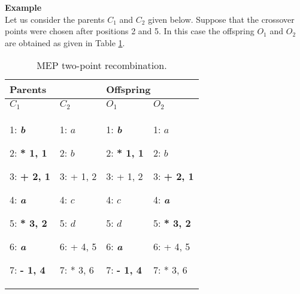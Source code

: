 \documentclass [11pt]{article}
\begin{document}
\textbf{Example}\\

Let us consider the parents $C_{1}$ and $C_{2}$ given below. Suppose that the 
crossover points were chosen after positions 2 and 5. In this case the 
offspring $O_{1}$ and $O_{2}$ are obtained as given in Table \ref{mep_two_cut_point}.


\begin{table}[htbp]
\begin{center}
\caption{MEP two-point recombination.}
\begin{tabular}
{p{55pt}p{49pt}p{49pt}p{49pt}}
\hline
\multicolumn{2}{p{104pt}}{Parents } & 
\multicolumn{2}{p{98pt}}{Offspring}  \\
\hline
$C_{1}$& 
$C_{2}$& 
$O_{1}$& 
$O_{2}$ \\
\hline
1: \textbf{\textit{b}} \par 2: \textbf{* 1, 1} \par 3: \textbf{+ 2, 1} \par 4: \textbf{\textit{a}} \par 5: \textbf{* 3, 2} \par 6: \textbf{\textit{a}} \par 7: \textbf{- 1, 4}& 
1: $a$ \par 2: $b$ \par 3: + 1, 2 \par 4: $c$ \par 5: $d$ \par 6: + 4, 5 \par 7: * 3, 6& 
1: \textbf{\textit{b}} \par 2: \textbf{* 1, 1} \par 3: + 1, 2 \par 4: $c$ \par 5: $d$ \par 6: \textbf{\textit{a}} \par 7: \textbf{- 1, 4}& 
1: $a$ \par 2: $b$ \par 3:\textbf{ + 2, 1} \par 4: \textbf{\textit{a}} \par 5: \textbf{* 3, 2} \par 6: + 4, 5 \par 7: * 3, 6 \\
\hline
\end{tabular}
\end{center}
\label{mep_two_cut_point}
\end{table}
\end{document}
